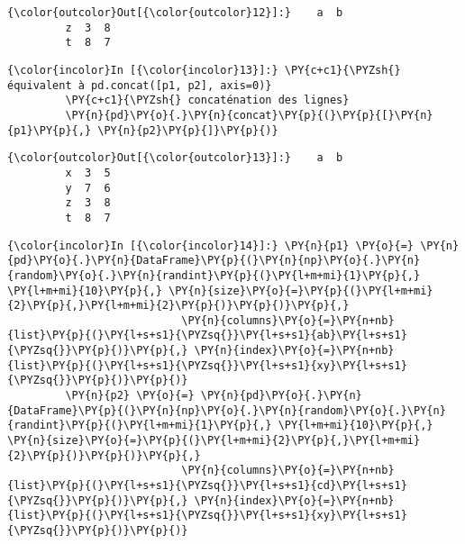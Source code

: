 \begin{Verbatim}[commandchars=\\\{\},frame=single,framerule=0.3mm,rulecolor=\color{cellframecolor}]
{\color{outcolor}Out[{\color{outcolor}12}]:}    a  b
         z  3  8
         t  8  7
\end{Verbatim}
            
    \begin{Verbatim}[commandchars=\\\{\},frame=single,framerule=0.3mm,rulecolor=\color{cellframecolor}]
{\color{incolor}In [{\color{incolor}13}]:} \PY{c+c1}{\PYZsh{} équivalent à pd.concat([p1, p2], axis=0)}
         \PY{c+c1}{\PYZsh{} concaténation des lignes}
         \PY{n}{pd}\PY{o}{.}\PY{n}{concat}\PY{p}{(}\PY{p}{[}\PY{n}{p1}\PY{p}{,} \PY{n}{p2}\PY{p}{]}\PY{p}{)}
\end{Verbatim}


\begin{Verbatim}[commandchars=\\\{\},frame=single,framerule=0.3mm,rulecolor=\color{cellframecolor}]
{\color{outcolor}Out[{\color{outcolor}13}]:}    a  b
         x  3  5
         y  7  6
         z  3  8
         t  8  7
\end{Verbatim}
            
    \begin{Verbatim}[commandchars=\\\{\},frame=single,framerule=0.3mm,rulecolor=\color{cellframecolor}]
{\color{incolor}In [{\color{incolor}14}]:} \PY{n}{p1} \PY{o}{=} \PY{n}{pd}\PY{o}{.}\PY{n}{DataFrame}\PY{p}{(}\PY{n}{np}\PY{o}{.}\PY{n}{random}\PY{o}{.}\PY{n}{randint}\PY{p}{(}\PY{l+m+mi}{1}\PY{p}{,} \PY{l+m+mi}{10}\PY{p}{,} \PY{n}{size}\PY{o}{=}\PY{p}{(}\PY{l+m+mi}{2}\PY{p}{,}\PY{l+m+mi}{2}\PY{p}{)}\PY{p}{)}\PY{p}{,}
                           \PY{n}{columns}\PY{o}{=}\PY{n+nb}{list}\PY{p}{(}\PY{l+s+s1}{\PYZsq{}}\PY{l+s+s1}{ab}\PY{l+s+s1}{\PYZsq{}}\PY{p}{)}\PY{p}{,} \PY{n}{index}\PY{o}{=}\PY{n+nb}{list}\PY{p}{(}\PY{l+s+s1}{\PYZsq{}}\PY{l+s+s1}{xy}\PY{l+s+s1}{\PYZsq{}}\PY{p}{)}\PY{p}{)}
         \PY{n}{p2} \PY{o}{=} \PY{n}{pd}\PY{o}{.}\PY{n}{DataFrame}\PY{p}{(}\PY{n}{np}\PY{o}{.}\PY{n}{random}\PY{o}{.}\PY{n}{randint}\PY{p}{(}\PY{l+m+mi}{1}\PY{p}{,} \PY{l+m+mi}{10}\PY{p}{,} \PY{n}{size}\PY{o}{=}\PY{p}{(}\PY{l+m+mi}{2}\PY{p}{,}\PY{l+m+mi}{2}\PY{p}{)}\PY{p}{)}\PY{p}{,}
                           \PY{n}{columns}\PY{o}{=}\PY{n+nb}{list}\PY{p}{(}\PY{l+s+s1}{\PYZsq{}}\PY{l+s+s1}{cd}\PY{l+s+s1}{\PYZsq{}}\PY{p}{)}\PY{p}{,} \PY{n}{index}\PY{o}{=}\PY{n+nb}{list}\PY{p}{(}\PY{l+s+s1}{\PYZsq{}}\PY{l+s+s1}{xy}\PY{l+s+s1}{\PYZsq{}}\PY{p}{)}\PY{p}{)}
\end{Verbatim}


